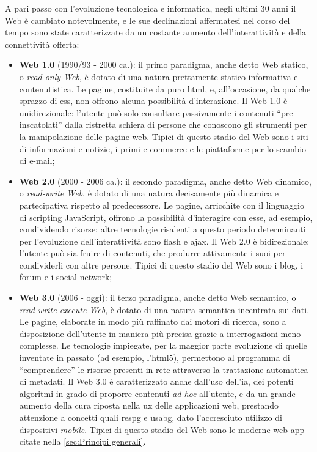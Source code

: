 A pari passo con l'evoluzione tecnologica e informatica, negli ultimi 30 anni il Web è cambiato notevolmente, e le sue declinazioni affermatesi nel corso del tempo sono state caratterizzate da un costante aumento dell'interattività e della connettività offerta:
\begin{itemize}
  \item \textbf{Web 1.0} (1990/93 - 2000 ca.): il primo paradigma, anche detto Web statico, o \textit{read-only Web}, è dotato di una natura prettamente statico-informativa e contenutistica. Le pagine, costituite da puro \gls{html}, e, all'occasione, da qualche sprazzo di \gls{css}, non offrono alcuna possibilità d'interazione. Il Web 1.0 è unidirezionale: l'utente può solo consultare passivamente i contenuti “pre-inscatolati” dalla ristretta schiera di persone che conoscono gli strumenti per la manipolazione delle pagine web. Tipici di questo stadio del Web sono i siti di informazioni e notizie, i primi e-commerce e le piattaforme per lo scambio di e-mail;
  
  \item \textbf{Web 2.0} (2000 - 2006 ca.): il secondo paradigma, anche detto Web dinamico, o \textit{read-write Web}, è dotato di una natura decisamente più dinamica e partecipativa rispetto al predecessore. Le pagine, arricchite con il linguaggio di scripting JavaScript, offrono la possibilità d'interagire con esse, ad esempio, condividendo risorse; altre tecnologie risalenti a questo periodo determinanti per l'evoluzione dell'interattività sono \gls{flash} e \gls{ajax}. Il Web 2.0 è bidirezionale: l'utente può sia fruire di contenuti, che produrre attivamente i suoi per condividerli con altre persone. Tipici di questo stadio del Web sono i blog, i forum e i social network;
  
  \item \textbf{Web 3.0} (2006 - oggi): il terzo paradigma, anche detto Web semantico, o \textit{read-write-execute Web}, è dotato di una natura semantica incentrata sui dati. Le pagine, elaborate in modo più raffinato dai motori di ricerca, sono a disposizione dell'utente in maniera più precisa grazie a interrogazioni meno complesse. Le tecnologie impiegate, per la maggior parte evoluzione di quelle inventate in passato (ad esempio, l'\gls{html}5), permettono al programma di “comprendere” le risorse presenti in rete attraverso la trattazione automatica di metadati. Il Web 3.0 è caratterizzato anche dall'uso dell'\gls{ia}, dei potenti algoritmi in grado di proporre contenuti \textit{ad hoc} all'utente, e da un grande aumento della cura riposta nella \gls{ux} delle applicazioni web, prestando attenzione a concetti quali \gls{respg} e \gls{usabg}, dato l'accresciuto utilizzo di dispositivi \textit{mobile}.
  Tipici di questo stadio del Web sono le moderne web app citate nella \autoref{sec:Principi generali}. 
  
\end{itemize}

